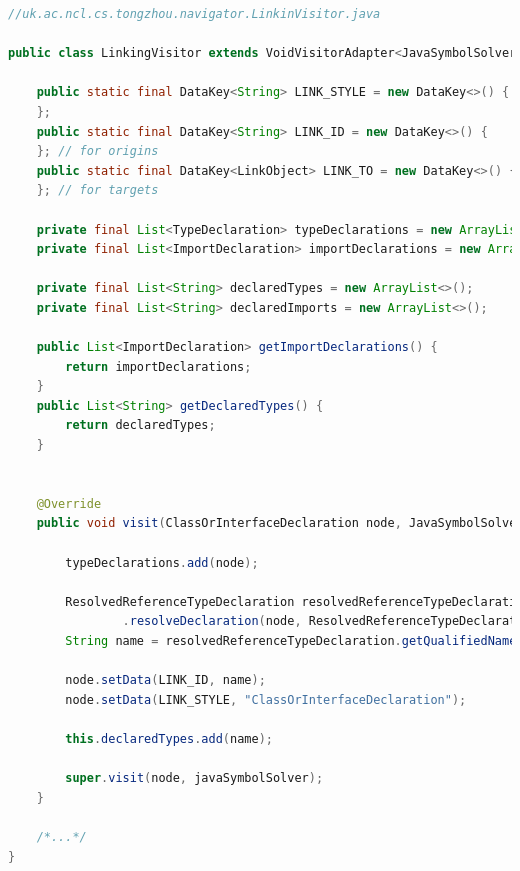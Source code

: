 \documentclass[runningheads]{llncs}
\begin{document}
\begin{lstlisting}[language=Java, caption=Retrieve type declaration during visiting]
//uk.ac.ncl.cs.tongzhou.navigator.LinkinVisitor.java
	
public class LinkingVisitor extends VoidVisitorAdapter<JavaSymbolSolver> {

    public static final DataKey<String> LINK_STYLE = new DataKey<>() {
    };
    public static final DataKey<String> LINK_ID = new DataKey<>() {
    }; // for origins
    public static final DataKey<LinkObject> LINK_TO = new DataKey<>() {
    }; // for targets

    private final List<TypeDeclaration> typeDeclarations = new ArrayList<>();
    private final List<ImportDeclaration> importDeclarations = new ArrayList<>();

    private final List<String> declaredTypes = new ArrayList<>();
    private final List<String> declaredImports = new ArrayList<>();

    public List<ImportDeclaration> getImportDeclarations() {
        return importDeclarations;
    }
    public List<String> getDeclaredTypes() {
        return declaredTypes;
    }


    @Override
    public void visit(ClassOrInterfaceDeclaration node, JavaSymbolSolver javaSymbolSolver) {

        typeDeclarations.add(node);

        ResolvedReferenceTypeDeclaration resolvedReferenceTypeDeclaration = javaSymbolSolver
                .resolveDeclaration(node, ResolvedReferenceTypeDeclaration.class);
        String name = resolvedReferenceTypeDeclaration.getQualifiedName();

        node.setData(LINK_ID, name);
        node.setData(LINK_STYLE, "ClassOrInterfaceDeclaration");

        this.declaredTypes.add(name);

        super.visit(node, javaSymbolSolver);
	}
	
	/*...*/
}
\end{lstlisting}
\end{document}
